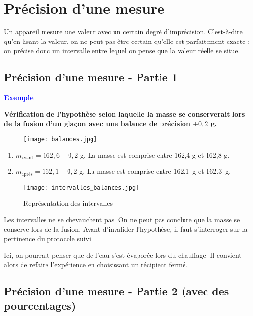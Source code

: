 \documentclass[a4paper,12pt]{article}
\begin{document}
\section{Précision d'une mesure}

Un appareil mesure une valeur avec un certain degré d'imprécision. C'est-à-dire qu'en lisant la valeur, on ne peut pas être certain qu'elle est parfaitement exacte : on précise donc un intervalle entre lequel on pense que la valeur réelle se situe. 

\subsection{Précision d'une mesure - Partie 1}

\textcolor{blue}{\textbf{Exemple}} 
\vspace{1em}

\textbf{Vérification de l’hypothèse selon laquelle la masse se conserverait lors de la fusion d’un glaçon avec une balance de précision $\pm 0,2$ g.}

\begin{figure}[H]
  \centering
  \texttt{[image: balances.jpg]}
\end{figure}

\begin{enumerate}[noitemsep]
    \item $m_{\text{avant}} = 162,6 \pm 0,2$ g. La masse est comprise entre 162,4 g et 162,8 g.
    \item $m_{\text{après}} = 162,1 \pm 0,2$ g. La masse est comprise entre \SI{162,1}{g} et \SI{162,3}{g}.
\end{enumerate}


\begin{figure}[H]
  \centering
  \texttt{[image: intervalles\_balances.jpg]}
  \caption{Représentation des intervalles}
\end{figure}

Les intervalles ne se chevauchent pas. On ne peut pas conclure que la masse se conserve lors de la fusion.
Avant d'invalider l'hypothèse, il faut s'interroger sur la pertinence du protocole suivi.

\vspace{1em}

Ici, on pourrait penser que de l'eau s'est évaporée lors du chauffage. Il convient alors de refaire l'expérience en choisissant un récipient fermé.

\subsection{Précision d'une mesure - Partie 2 (avec des pourcentages)}
\end{document}
